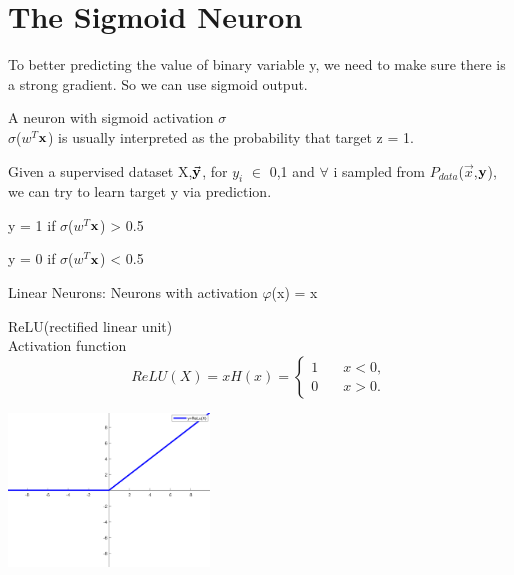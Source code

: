 \section{The Sigmoid Neuron}

To better predicting the value of binary variable y, we need to make sure there is a strong gradient. So we can use sigmoid output.

\begin{definition}
    A neuron with sigmoid activation $\sigma$ \\
    $\sigma$($w^T$$\vx$) is usually interpreted as the probability that target z = 1.
\end{definition}

Given a supervised dataset X,$\Vec{\vy}$, for $y_i$ $\in$ {0,1} and $\forall$ i sampled from $P_{data}$($\Vec{x}$,$\vy$), we can try to learn target y via prediction.\\

\centerline {y = 1 if $\sigma$($w^T$$\vx$) > 0.5} 
\centerline {y = 0 if $\sigma$($w^T$$\vx$) < 0.5}

Linear Neurons: Neurons with activation $\varphi$(x) = x

\begin{definition}
    ReLU(rectified linear unit)\\
    Activation function
    \begin{equation*}
        ReLU(X) = xH(x) = \begin{cases}
        1 & \quad x < 0, \\
        0 & \quad x > 0.
        \end{cases}
    \end{equation*}
\end{definition}

\begin{center}
    \includegraphics[width=2.1in]{images/Chapter 10/ReLU.png}
\end{center}



